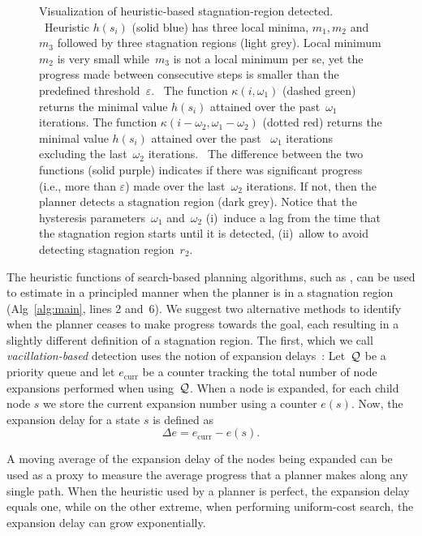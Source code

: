 \documentclass{article}
\begin{document}
\begin{figure}[t]
  \caption{%
    Visualization of heuristic-based stagnation-region detected.   
	~Heuristic $h(s_i)$ (solid blue) has three local minima, $m_1, m_2$ and $m_3$ followed by three stagnation regions (light grey). Local minimum $m_2$ is very small while~$m_3$ is not a local minimum per se, yet the progress made between consecutive steps is smaller than the predefined threshold~$\varepsilon$.
    ~The function $\kappa(i,\omega_1)$ (dashed green) returns the minimal value $h(s_i)$ attained over the past~$\omega_1$ iterations.
    The function $\kappa(i-\omega_2,\omega_1-\omega_2)$ (dotted red) returns the minimal value $h(s_i)$ attained over the past ~$\omega_1$ iterations excluding the last~$\omega_2$ iterations.
    ~The difference between the two functions (solid purple) indicates if there was significant progress (i.e., more than $\varepsilon$) made over the last~$\omega_2$ iterations. 
    If not, then the planner detects a stagnation region (dark grey).
		Notice that the hysteresis parameters~$\omega_1$ and~$\omega_2$ 
		(i)~induce a lag from the time that the stagnation region starts until it is detected,
		(ii)~allow to avoid detecting stagnation region~$r_2$.  
		}%

  \label{fig:filmstrip-local-min2}%


\end{figure}

The heuristic functions of search-based planning algorithms, such as \mhastar, can be used to estimate in a principled manner when the planner is in a stagnation region (Alg~\ref{alg:main}, lines 2 and~6). 
%
We suggest two alternative methods to identify when the planner ceases to make progress towards the goal, each resulting in a slightly different definition of a  stagnation region.
The first, which we call \emph{vacillation-based} detection uses the notion of expansion delays~\cite{DTR11}:
Let~$\mathcal{Q}$ be a priority queue and let $e_\text{curr}$ be a counter tracking the total number of node expansions performed when using~$\mathcal{Q}$.
When a node is expanded, for each child node $s$ we store the current expansion number using a counter $e(s)$.
Now, the expansion delay for a state $s$ is defined as
$$
\Delta e = e_\text{curr} - e(s).
$$ 

A moving average of the expansion delay of the nodes being expanded can be used as a proxy to measure the average progress that a planner makes along any single path.
When the heuristic used by a planner is perfect, the expansion delay equals one, while on the other extreme, when performing uniform-cost search, the expansion delay can grow exponentially.
\end{document}
